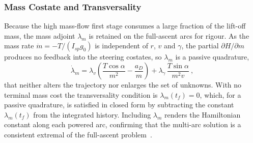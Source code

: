 \subsubsection{Mass Costate and Transversality}
\label{sssec:fa_masscostate}

Because the high mass-flow first stage consumes a large fraction of the lift-off mass, the mass adjoint $\lambda_m$ is retained on the full-ascent arcs for rigour. As the mass rate $\dot{m} = -T/(I_{sp}g_0)$ is independent of $r$, $v$ and $\gamma$, the partial $\partial H/\partial m$ produces no feedback into the steering costates, so $\lambda_m$ is a passive quadrature,
\begin{equation}
\dot{\lambda}_m = \lambda_v\!\left(\frac{T\cos\alpha}{m^{2}} - \frac{a_D}{m}\right)
+ \lambda_\gamma\,\frac{T\sin\alpha}{m^{2}v} \ ,
\label{eq:fa_masscostate}
\end{equation}
that neither alters the trajectory nor enlarges the set of unknowns. With no terminal mass cost the transversality condition is $\lambda_m(t_f)=0$, which, for a passive quadrature, is satisfied in closed form by subtracting the constant $\lambda_m(t_f)$ from the integrated history. Including $\lambda_m$ renders the Hamiltonian constant along each powered arc, confirming that the multi-arc solution is a consistent extremal of the full-ascent problem~\cite{pontani2013ascent,pontani2019ascent}.
